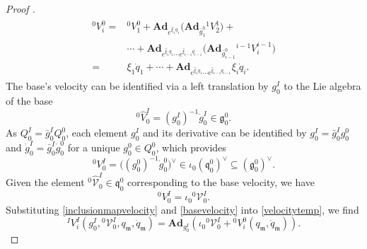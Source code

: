 \documentclass[lettersize,journal]{IEEEtran}
\def \g  {\mathfrak{g}}
\def \q  {\mathfrak{q}}
\def \m  {\mathfrak{m}}
\def \Ad {\textbf{Ad}}
\theoremstyle{remark}
\begin{document}
\begin{proof}[Proof ]
\begin{align} 
\begin{split}
{}^0V^0_i=&{}^0V_{1}^{0}+\Ad_{e^{\hat{\xi}_1q_1}}\big(\Ad_{\bar{g}^0_1}{}^1V_{2}^{1}\big)+\\
    &\cdots+\Ad_{e^{\hat{\xi}_1q_1}\cdots e^{\hat{\xi}_{i-1}q_{i-1}}}\big(\Ad_{\bar{g}^0_{i-1}}{}^{i-1}V_{i}^{i-1}\big)\\
    =&\xi_1\dot{q}_1+\cdots+\Ad_{e^{\hat{\xi}_{1}q_{1}}\cdots e^{\hat{\xi}_{i-1}q_{i-1}}}\xi_i\dot{q}_i. \label{basevelocity}
    \end{split}
\end{align}
The base's velocity can be identified via a left translation by $g^I_0$ to the Lie algebra of the base
\begin{equation}
    ^0\hat{V}_0^I=({g_0^I})^{-1}\dot{g}_0^I \in \g^0_0.
\end{equation}
As $Q^I_0=\bar{g}^I_0Q^0_0$, each element $g^I_0$ and its derivative can be identified by $g^I_0=\bar{g}^I_0g^0_0$ and $\dot{g}^I_0=\bar{g}^I_0\dot{g}^0_0$ for a unique $g_0^0\in Q_0^0$, which provides
\begin{equation}
    ^0{V}_0^I=\big(({g_0^0})^{-1}\dot{g}_0^0\big)^\vee \in \iota_0(\q^0_0)^\vee \subseteq (\g^0_0)^\vee.
\end{equation}
Given the element ${}^0\hat{\mathcal{V}}^I_0\in \q^0_0$ corresponding to the base velocity, we have
\begin{equation}
    ^0{V}_0^I=\iota_0{}^0\mathcal{V}^I_0.
    \label{inclusionmapvelocity}
\end{equation} 
Substituting \eqref{inclusionmapvelocity} and \eqref{basevelocity} into \eqref{velocitytemp}, we find
\begin{equation}
^IV_i^{I}(g^I_0,{}^0\mathcal{V}^I_0,q_\m,\dot{q}_\m)=\Ad_{g^I_0}(\iota_0{}^0\mathcal{V}^I_0+{}^0V^0_i(q_\m,\dot{q}_\m)).
\end{equation}

\end{proof}
\end{document}
